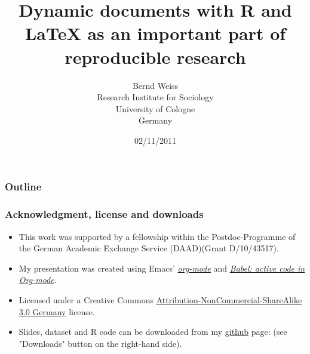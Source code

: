 \documentclass[bigger]{beamer}
\begin{document}
\title{Dynamic documents with R and \LaTeX{} as an important part of reproducible research}
\author{Bernd Weiss\\Research Institute for Sociology\\University of Cologne\\Germany\\}
\date{02/11/2011 \vfill \byncsa}
\maketitle

\begin{frame}
\frametitle{Outline}
\setcounter{tocdepth}{3}
\tableofcontents
\end{frame}





\newcommand{\infobox}[1]{
  \vfill\vfill\hrule
  \begin{columns}[t]
    \begin{column}{0.02\textwidth}
      \Info
    \end{column}
    \begin{column}[T]{0.97\textwidth}
      \tiny{#1}
    \end{column}
\end{columns}}



\begin{frame}\frametitle{Acknowledgment, license and downloads}
\begin{itemize}
\item This work was supported by a fellowship within the Postdoc-Programme of the German Academic
  Exchange Service (DAAD)(Grant D/10/43517).
\item My presentation was created using Emacs' \href{http://orgmode.org/}{\emph{org-mode}} and
\href{http://orgmode.org/worg/org-contrib/babel/}{\emph{Babel: active code in
Org-mode}}. 
\item Licensed under a Creative Commons
\href{http://creativecommons.org/licenses/by-nc-sa/3.0/de/deed.en}{Attribution-NonCommercial-ShareAlike
3.0 Germany} license.
\item Slides, dataset and R code can be downloaded from my
\href{https://github.com/berndweiss/dynamic_documents_with_r}{github}
page: (see "Downloads" button on the right-hand side).
\end{itemize}
\end{frame}
\end{document}
